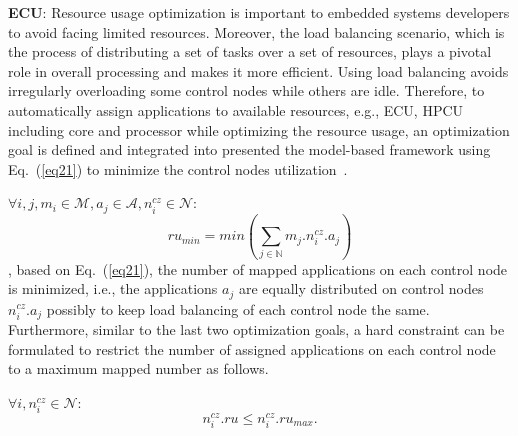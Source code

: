       \textbf{ECU}:
    Resource usage optimization is important to embedded systems developers to avoid facing limited resources. Moreover, the load balancing scenario, which is the process of distributing a set of tasks over a set of resources, plays a pivotal role in overall processing and makes it more efficient. Using load balancing avoids irregularly overloading some control nodes while others are idle. Therefore, to automatically assign applications to available resources, e.g., ECU, HPCU including core and processor while optimizing the resource usage, an optimization goal is defined and integrated into presented the model-based framework using Eq.~(\ref{eq21}) to minimize the control nodes utilization~\cite{askaripoor2023designer}.\newline
    
    
    
    $\forall i,j, m_i \in\mathcal{M},  a_j \in\mathcal{A}, {n_{i}^{cz}} \in \mathcal{N}$:
    \begin{equation}
    	ru_{min} = min (\sum_{j \in \mathbb{N}} {m_j}.{n_i^{cz}}.a_j) 
    	\label{eq21}
    \end{equation}
    , based on Eq.~(\ref{eq21}), the number of mapped applications on each control node is minimized, i.e., the applications $a_j$ are equally distributed on control nodes $n_i^{cz}.a_j$ possibly to keep load balancing of each control node the same. Furthermore, similar to the last two optimization goals, a hard constraint can be formulated to restrict the number of assigned applications on each control node to a maximum mapped number as follows.\newline      
      
      
      
    $\forall i, n_i^{cz} \in\mathcal{N} $:
    \begin{equation}
    	n_i^{cz}.ru \leq n_i^{cz}.ru_{max}. 
    	\label{eq22}
    \end{equation}
    
    
